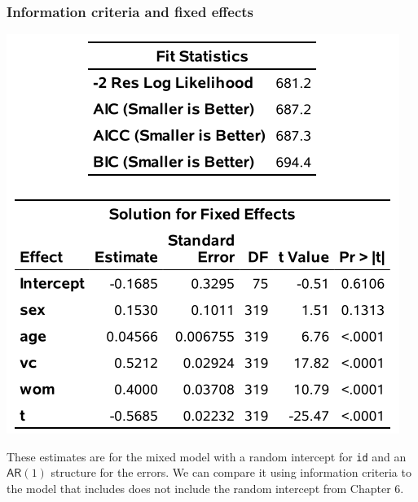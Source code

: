 \documentclass{beamer}
\begin{document}
\begin{frame}[fragile]
\frametitle{Information criteria and fixed effects}
\begin{center}
\includegraphics[width =0.6\linewidth]{img/c6/slides7-e18}
\end{center}
{\footnotesize 
These estimates are for the mixed model with a random intercept for \texttt{id} and an $\mathsf{AR}(1)$ structure for the errors. We can compare it using information criteria to the model that includes does not include the random intercept from Chapter 6.

}
\end{frame}
\end{document}
